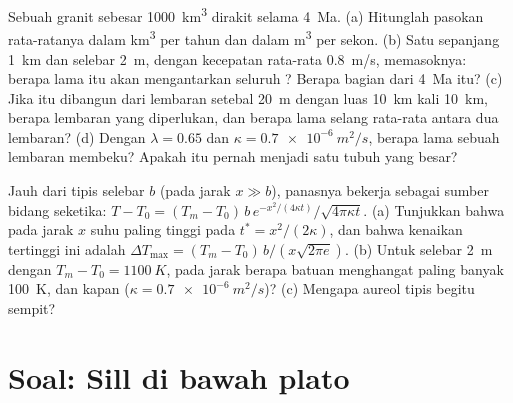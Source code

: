 \begin{exercise}[$\star\star\star$]\label{exo:b2:magma-emplacement:11}
Sebuah  granit sebesar \qty{1000}{km^3} dirakit selama \qty{4}{Ma}. (a) Hitunglah
pasokan  rata-ratanya dalam \unit{km^3} per tahun dan dalam \unit{m^3} per sekon. (b)
Satu  sepanjang \qty{1}{km} dan selebar \qty{2}{m}, dengan kecepatan rata-rata
\qty{0.8}{m/s}, memasoknya: berapa lama  itu akan mengantarkan seluruh
? Berapa bagian dari \qty{4}{Ma} itu? (c) Jika  itu dibangun dari
lembaran setebal \qty{20}{m} dengan luas \qty{10}{km} kali \qty{10}{km}, berapa lembaran
yang diperlukan, dan berapa lama selang rata-rata antara dua lembaran? (d) Dengan
$\lambda = 0.65$ dan $\kappa = \qty{0.7e-6}{m^2/s}$, berapa lama sebuah lembaran
membeku? Apakah  itu pernah menjadi satu tubuh  yang besar?
\end{exercise}

\begin{exercise}[$\star\star\star$]\label{exo:b2:magma-emplacement:12}
Jauh dari  tipis selebar $b$ (pada jarak $x \gg b$), panasnya bekerja sebagai
sumber bidang seketika: $T - T_0 = (T_m - T_0)\,b\,e^{-x^2/(4\kappa
t)}/\sqrt{4\pi\kappa t}$. (a) Tunjukkan bahwa pada jarak $x$ suhu paling tinggi pada
$t^* = x^2/(2\kappa)$, dan bahwa kenaikan tertinggi ini adalah $\Delta T_{\max} = (T_m -
T_0)\,b/(x\sqrt{2\pi e})$. (b) Untuk  selebar \qty{2}{m} dengan $T_m - T_0 =
\qty{1100}{K}$, pada jarak berapa batuan menghangat paling banyak \qty{100}{K}, dan
kapan ($\kappa = \qty{0.7e-6}{m^2/s}$)? (c) Mengapa aureol  tipis begitu
sempit?
\end{exercise}

\section{Soal: Sill di bawah plato}

